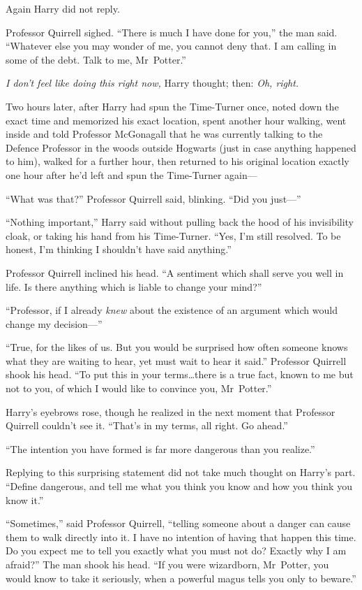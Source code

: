 Again Harry did not reply.

Professor Quirrell sighed. “There is much I have done for you,” the man said. “Whatever else you may wonder of me, you cannot deny that. I am calling in some of the debt. Talk to me, Mr~Potter.”

\emph{I don’t feel like doing this right now,} Harry thought; then: \emph{Oh, right.}

\later

Two hours later, after Harry had spun the Time-Turner once, noted down the exact time and memorized his exact location, spent another hour walking, went inside and told Professor McGonagall that he was currently talking to the Defence Professor in the woods outside Hogwarts (just in case anything happened to him), walked for a further hour, then returned to his original location exactly one hour after he’d left and spun the Time-Turner again—

\later

“What was that?” Professor Quirrell said, blinking. “Did you just—”

“Nothing important,” Harry said without pulling back the hood of his invisibility cloak, or taking his hand from his Time-Turner. “Yes, I’m still resolved. To be honest, I’m thinking I shouldn’t have said anything.”

Professor Quirrell inclined his head. “A sentiment which shall serve you well in life. Is there anything which is liable to change your mind?”

“Professor, if I already \emph{knew} about the existence of an argument which would change my decision—”

“True, for the likes of us. But you would be surprised how often someone knows what they are waiting to hear, yet must wait to hear it said.” Professor Quirrell shook his head. “To put this in your terms…there is a true fact, known to me but not to you, of which I would like to convince you, Mr~Potter.”

Harry’s eyebrows rose, though he realized in the next moment that Professor Quirrell couldn’t see it. “That’s in my terms, all right. Go ahead.”

“The intention you have formed is far more dangerous than you realize.”

Replying to this surprising statement did not take much thought on Harry’s part. “Define dangerous, and tell me what you think you know and how you think you know it.”

“Sometimes,” said Professor Quirrell, “telling someone about a danger can cause them to walk directly into it. I have no intention of having that happen this time. Do you expect me to tell you exactly what you must not do? Exactly why I am afraid?” The man shook his head. “If you were wizardborn, Mr~Potter, you would know to take it seriously, when a powerful magus tells you only to beware.”

